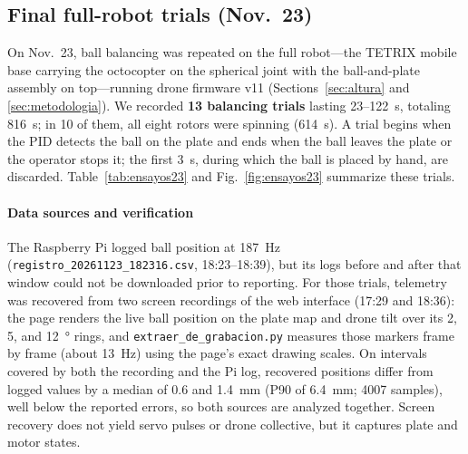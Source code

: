 \subsection{Final full-robot trials (Nov.~23)}
\label{sec:ensayos23}
On Nov.~23, ball balancing was repeated on the full robot---the TETRIX mobile base carrying the octocopter on the spherical joint with the ball-and-plate assembly on top---running drone firmware v11 (Sections~\ref{sec:altura} and \ref{sec:metodologia}). We recorded \textbf{13 balancing trials} lasting 23--\SI{122}{\second}, totaling \SI{816}{\second}; in 10 of them, all eight rotors were spinning (\SI{614}{\second}). A trial begins when the PID detects the ball on the plate and ends when the ball leaves the plate or the operator stops it; the first \SI{3}{\second}, during which the ball is placed by hand, are discarded. Table~\ref{tab:ensayos23} and Fig.~\ref{fig:ensayos23} summarize these trials.

\paragraph{Data sources and verification} The Raspberry Pi logged ball position at \SI{187}{\hertz} (\texttt{registro\_20261123\_182316.csv}, 18:23--18:39), but its logs before and after that window could not be downloaded prior to reporting. For those trials, telemetry was recovered from two screen recordings of the web interface (17:29 and 18:36): the page renders the live ball position on the plate map and drone tilt over its 2, 5, and \SI{12}{\degree} rings, and \texttt{extraer\_de\_grabacion.py} measures those markers frame by frame (about \SI{13}{\hertz}) using the page's exact drawing scales. On intervals covered by both the recording and the Pi log, recovered positions differ from logged values by a median of 0.6 and \SI{1.4}{\milli\metre} (P90 of \SI{6.4}{\milli\metre}; 4007 samples), well below the reported errors, so both sources are analyzed together. Screen recovery does not yield servo pulses or drone collective, but it captures plate and motor states.

